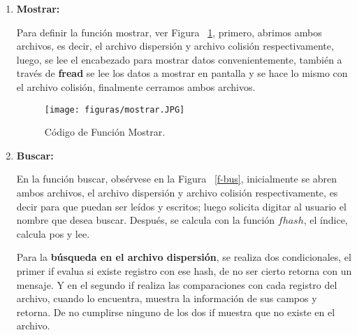 \documentclass[10pt,conference]{IEEEtran}
\begin{document}
\begin{enumerate}[]
         Luego con un if else, se enlaza un registro anterior para que apunte al nuevo. Evalúa de cumplirse la igualdad entre -1 y el campo SR de s, para el caso 1, si el anterior estará en  $*.txt$, de ser cierto ingresa y actualiza el campo SR, posiciona y escribe. Para el caso 2, el anterior esta en $*.col$, por lo que actualiza el sgte y con un while recorre la lista enlazada hasta el final, aquí también se posiciona y escribe.
        Para el do while mencionado inicialmente, se dará si rpta es S o s, de no cumplirse se termina. Finalmente se actualiza los encabezados y cierra de los dos archivos.
        
    \item {\textbf{Mostrar:}}
        \par Para definir la función mostrar, ver Figura ~\ref{f-mos}, primero, abrimos ambos archivos, es decir, el archivo dispersión y archivo colisión respectivamente, luego, se lee el encabezado para mostrar datos convenientemente, también a través de \textbf{fread} se lee los datos a mostrar en pantalla y se hace lo mismo con el archivo colisión, finalmente cerramos ambos archivos.
         \begin{figure}[H]
            \begin{center}
            \texttt{[image: figuras/mostrar.JPG]}
            \caption{Código de Función Mostrar.}
            \label{f-mos} 
            \end{center}
        \end{figure}
    \item {\textbf{Buscar:}}
        \par En la función buscar, obsérvese en la Figura ~\ref{f-bus}, inicialmente se abren ambos archivos, el archivo dispersión y archivo colisión respectivamente, es decir para que puedan ser leídos y escritos; luego solicita digitar al usuario el nombre que desea buscar. Después, se calcula con la función $fhash$, el índice, calcula pos y lee.
        
        Para la \textbf{búsqueda en el archivo dispersión}, se realiza dos condicionales, el primer if evalua si existe registro con ese hash, de no ser cierto retorna con un mensaje. Y en el segundo if realiza las comparaciones con cada registro del archivo, cuando lo encuentra, muestra la información de sus campos y retorna. De no cumplirse ninguno de los dos if muestra que no existe en el archivo.
        

\end{enumerate}
\end{document}

